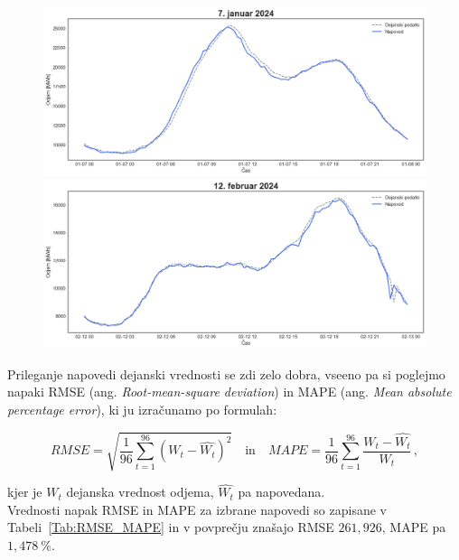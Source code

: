 \documentclass[a4paper, 11pt]{article}
\begin{document}
\begin{figure}[!ht]
    \centering
    \begin{minipage}[c]{0.48\linewidth}
        \includegraphics[width=\linewidth]{napoved_5.png}
    \end{minipage}
    \hfill
    \begin{minipage}[c]{0.48\linewidth}
        \includegraphics[width=\linewidth]{napoved_6.png}
    \end{minipage}
\end{figure}

\noindent Prileganje napovedi dejanski vrednosti se zdi zelo dobra, vseeno pa si
poglejmo napaki RMSE (ang. \emph{Root-mean-square deviation}) in 
MAPE (ang. \emph{Mean absolute percentage error}), ki ju izračunamo po formulah:

$$
RMSE = \sqrt{\frac{1}{96}\sum_{t=1}^{96}{(W_t-\hat{W_t})^2}} \quad \textrm{in} \quad
MAPE = \frac{1}{96}\sum_{t=1}^{96}{\frac{W_t-\hat{W_t}}{W_t}} \,,
$$

\noindent kjer je $W_t$ dejanska vrednost odjema, $\hat{W_t}$ pa napovedana. \\

\noindent Vrednosti napak RMSE in MAPE za izbrane napovedi so zapisane v Tabeli~\ref{Tab:RMSE_MAPE} in 
v povprečju znašajo RMSE $261{,}926$, MAPE pa $1{,}478~\%$. \\
\end{document}
